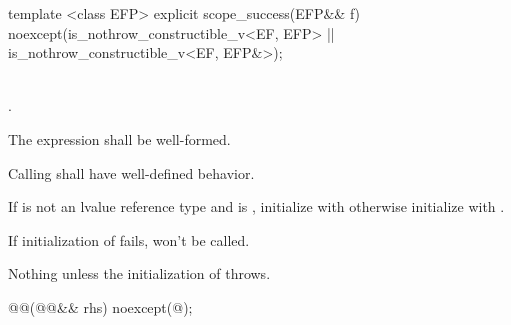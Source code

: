 \documentclass[ebook,11pt,article]{memoir}
\begin{document}
\begin{itemdecl}
template <class EFP>
explicit
scope_success(EFP&& f) noexcept(is_nothrow_constructible_v<EF, EFP>
                             || is_nothrow_constructible_v<EF, EFP&>);
\end{itemdecl}

\begin{itemdescr}
\pnum
\constraints  
{} \tcode{\&\&}\\
.

\pnum
\mandates 
The expression  shall be well-formed.

\pnum
\expects
Calling  shall have well-defined behavior.


\pnum
\effects If  is not an lvalue reference type and  is , initialize   with  otherwise initialize  with . 
\begin{note}
If initialization of  fails,  won't be called.
\end{note}

\pnum
\throws Nothing unless the initialization of  throws.

\end{itemdescr}

\newpage
\begin{itemdecl}
@@(@@&& rhs) noexcept(@\seebelow@);
\end{itemdecl}
\end{document}
